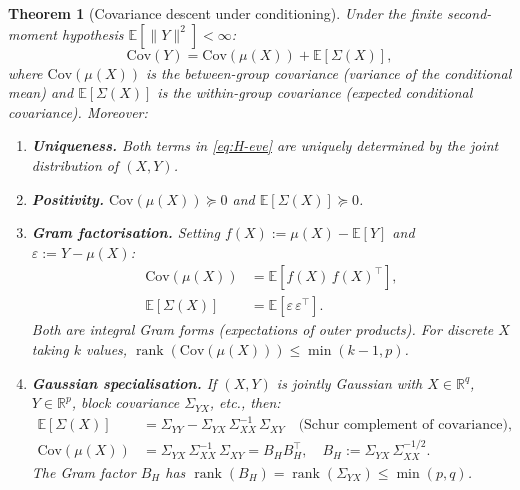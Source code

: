 \documentclass[11pt,a4paper]{article}
\numberwithin{equation}{section}
\DeclareMathOperator{\rank}{rank}
\newcommand{\R}{\mathbb{R}}
\theoremstyle{thmcompact}
\newtheorem{theorem}{Theorem}[section]
\theoremstyle{remark}
\begin{document}
\begin{theorem}[Covariance descent under conditioning]\label{thm:bridge-H}
Under the finite second-moment hypothesis $\mathbb{E}[\|Y\|^2] < \infty$:
\begin{equation}\label{eq:H-eve}
\mathrm{Cov}(Y) = \mathrm{Cov}(\mu(X)) + \mathbb{E}[\Sigma(X)],
\end{equation}
where $\mathrm{Cov}(\mu(X))$ is the \emph{between-group covariance} (variance of the conditional mean) and $\mathbb{E}[\Sigma(X)]$ is the \emph{within-group covariance} (expected conditional covariance). Moreover:
\begin{enumerate}[label=\textup{(\roman*)}]
\item \textbf{Uniqueness.} Both terms in \eqref{eq:H-eve} are uniquely determined by the joint distribution of $(X, Y)$.

\item \textbf{Positivity.} $\mathrm{Cov}(\mu(X)) \succeq 0$ and $\mathbb{E}[\Sigma(X)] \succeq 0$.

\item \textbf{Gram factorisation.} Setting $f(X) := \mu(X) - \mathbb{E}[Y]$ and $\varepsilon := Y - \mu(X)$:
\begin{align}
\mathrm{Cov}(\mu(X)) &= \mathbb{E}[f(X)\,f(X)^\top], \label{eq:H-gram-between} \\
\mathbb{E}[\Sigma(X)] &= \mathbb{E}[\varepsilon\,\varepsilon^\top]. \label{eq:H-gram-within}
\end{align}
Both are integral Gram forms (expectations of outer products). For discrete $X$ taking $k$ values, $\rank(\mathrm{Cov}(\mu(X))) \leq \min(k{-}1, p)$.

\item \textbf{Gaussian specialisation.} If $(X, Y)$ is jointly Gaussian with $X \in \R^q$, $Y \in \R^p$, block covariance $\Sigma_{YX}$, etc., then:
\begin{align}
\mathbb{E}[\Sigma(X)] &= \Sigma_{YY} - \Sigma_{YX}\,\Sigma_{XX}^{-1}\,\Sigma_{XY} \quad \text{(Schur complement of covariance)}, \label{eq:H-gauss-within} \\
\mathrm{Cov}(\mu(X)) &= \Sigma_{YX}\,\Sigma_{XX}^{-1}\,\Sigma_{XY} = B_H B_H^\top, \quad B_H := \Sigma_{YX}\,\Sigma_{XX}^{-1/2}. \label{eq:H-gauss-between}
\end{align}
The Gram factor $B_H$ has $\rank(B_H) = \rank(\Sigma_{YX}) \leq \min(p, q)$.
\end{enumerate}
\end{theorem}
\end{document}

